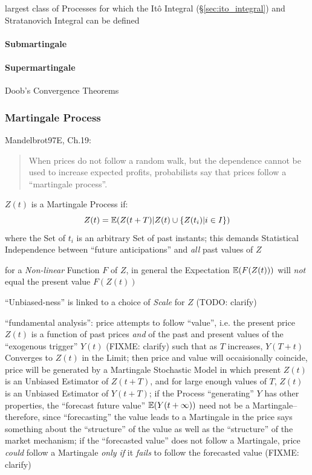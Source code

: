 largest class of Processes for which the It\^o Integral
(\S\ref{sec:ito_integral}) and Stratanovich Integral can be defined



\paragraph{Submartingale}\label{sec:submartingale}\hfill

\paragraph{Supermartingale}\label{sec:supermartingale}\hfill

Doob's Convergence Theorems



\subsubsection{Martingale Process}\label{sec:martingale_process}


Mandelbrot97E, Ch.19:

\begin{quote}
  When prices do not follow a random walk, but the dependence cannot be used to
  increase expected profits, probabilists say that prices follow a ``martingale
  process''.
\end{quote}

$Z(t)$ is a Martingale Process if:
\[
  Z(t) = \mathbb{E}(Z(t+T) | Z(t) \cup \{ Z(t_i) | i \in I \})
\]
where the Set of $t_i$ is an arbitrary Set of past instants; this demands
Statistical Independence between ``future anticipations'' and \emph{all} past
values of $Z$

for a \emph{Non-linear} Function $F$ of $Z$, in general the Expectation
$\mathbb{E}(F(Z(t)))$ will \emph{not} equal the present value $F(Z(t))$

``Unbiased-ness'' is linked to a choice of \emph{Scale} for $Z$ (TODO: clarify)

``fundamental analysis'': price attempts to follow ``value'', i.e. the present
price $Z(t)$ is a function of past prices \emph{and} of the past and present
values of the ``exogenous trigger'' $Y(t)$ (FIXME: clarify) such that as $T$
increases, $Y(T + t)$ Converges to $Z(t)$ in the Limit; then price and value
will occaisionally coincide, price will be generated by a Martingale Stochastic
Model in which present $Z(t)$ is an Unbiased Estimator of $Z(t + T)$, and for
large enough values of $T$, $Z(t)$ is an Unbiased Estimator of $Y(t + T)$; if
the Process ``generating'' $Y$ has other properties, the ``forecast future
value'' $\mathbb{E}(Y(t + \infty))$ need not be a Martingale-- therefore, since
``forecasting'' the value leads to a Martingale in the price says something
about the ``structure'' of the value as well as the ``structure'' of the market
mechanism; if the ``forecasted value'' does not follow a Martingale, price
\emph{could} follow a Martingale \emph{only if} it \emph{fails} to follow the
forecasted value (FIXME: clarify)

